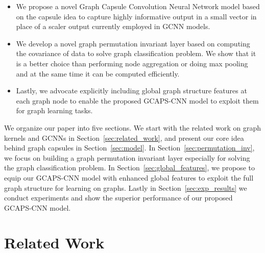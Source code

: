 \documentclass{article}
\begin{document}
\begin{itemize}[leftmargin=*]
	\setlength\itemsep{-0.1em}
\item  We propose a novel Graph Capsule Convolution Neural  Network  model based on the capsule idea to capture highly informative output in a small vector  in place of a scaler output currently employed in  GCNN models. 
\item  We develop a novel graph permutation invariant layer based on computing the covariance of data to solve graph classification problem. We show that it is a better choice than performing node aggregation or doing max pooling and at the same time it can be computed efficiently.
\item  Lastly, we  advocate explicitly including global graph structure features  at each graph node to enable the proposed GCAPS-CNN model to exploit them for graph learning tasks. 
\end{itemize}

We organize our paper into five sections. We start with the related work on graph kernels and GCNNs in Section~\ref{sec:related_work}, and present our core idea behind graph capsules  in Section~\ref{sec:model}. In Section~\ref{sec:permutation_inv}, we focus on building a graph permutation invariant layer especially for solving the graph classification problem. In Section~\ref{sec:global_features}, we propose to equip our GCAPS-CNN model with enhanced global features to   exploit the full  graph   structure for learning on graphs. Lastly in Section~\ref{sec:exp_results} we conduct experiments and show the superior performance of our proposed GCAPS-CNN model.





\section{Related Work}~\label{sec:related_work}
\end{document}
